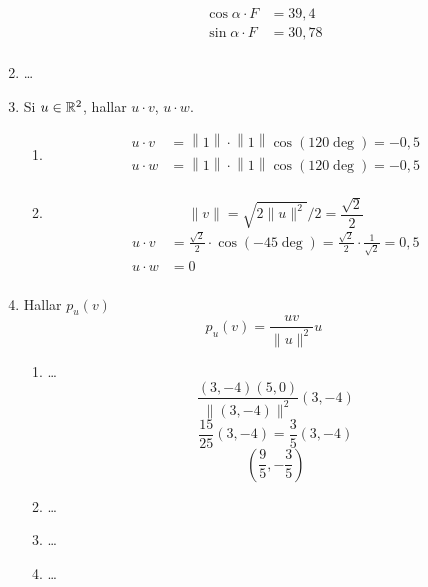 \documentclass[../practica.root.tex]{subfiles}
\begin{document}
\begin{enumerate}
          \begin{align*}
              \cos\alpha \cdot F & = 39,4  \\
              \sin\alpha \cdot F & = 30,78 \\
          \end{align*}

    \item \dots

    \item Si $u \in \mathbb{R}^2$, hallar $u \cdot v$, $u \cdot w$.
          \begin{enumerate}
              \item
                    \begin{align*}
                        u \cdot v & = \left\| 1 \right\| \cdot \left\| 1 \right\| \cos(120 \deg) = \boxed{-0,5} \\
                        u \cdot w & = \left\| 1 \right\| \cdot \left\| 1 \right\| \cos(120 \deg) = \boxed{-0,5} \\
                    \end{align*}
              \item
                    \[ \|v\| = \sqrt{2\|u\|^2}/2 = \frac{\sqrt{2}}{2}  \]
                    \begin{align*}
                        u \cdot v & = \frac{\sqrt{2}}{2}\cdot \cos(-45\deg) = \frac{\sqrt{2}}{2}\cdot\frac{1}{\sqrt{2}} = \boxed{0,5} \\
                        u \cdot w & = \boxed{0}                                                                                       \\
                    \end{align*}

          \end{enumerate}

    \item Hallar $p_u(v)$
          \[ p_u(v) = \frac{uv}{\|u\|^2}u \]
          \begin{enumerate}
              \item  \dots
                    \[ \frac{(3,-4)(5,0)}{\|(3,-4)\|^2}(3,-4) \]
                    \[ \frac{15}{25}(3,-4) = \frac{3}{5}(3,-4) \]
                    \[ \boxed{\left(\frac{9}{5}, -\frac{3}{5}\right)} \]
              \item  \dots
              \item  \dots
              \item  \dots
          \end{enumerate}


\end{enumerate}
\end{document}
